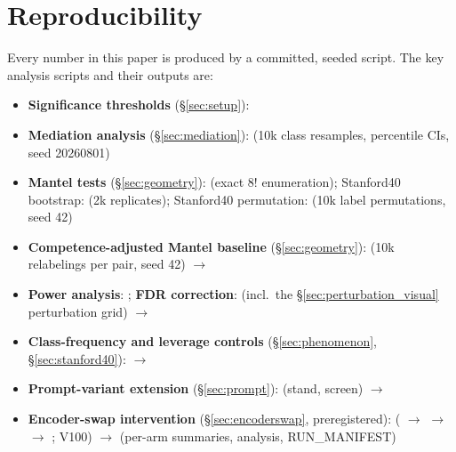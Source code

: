 \documentclass[a4paper,fleqn]{cas-sc}
\begin{document}
\section{Reproducibility}
\label{sec:reproducibility}
\sloppy\raggedright

Every number in this paper is produced by a committed, seeded script. The key analysis scripts and their outputs are:

\begin{itemize}
  \item \textbf{Significance thresholds} (\S\ref{sec:setup}): 
  \item \textbf{Mediation analysis} (\S\ref{sec:mediation}):  (10k class resamples, percentile CIs, seed 20260801)
  \item \textbf{Mantel tests} (\S\ref{sec:geometry}):  (exact $8!$ enumeration); Stanford40 bootstrap:  (2k replicates); Stanford40 permutation:  (10k label permutations, seed 42)
  \item \textbf{Competence-adjusted Mantel baseline} (\S\ref{sec:geometry}):  (10k relabelings per pair, seed 42) \hfill\break $\rightarrow$ 
  \item \textbf{Power analysis}: ; \textbf{FDR correction}:  (incl.\ the \S\ref{sec:perturbation_visual} perturbation grid) \hfill\break $\rightarrow$ 
  \item \textbf{Class-frequency and leverage controls} (\S\ref{sec:phenomenon}, \S\ref{sec:stanford40}):  \hfill\break $\rightarrow$ 
  \item \textbf{Prompt-variant extension} (\S\ref{sec:prompt}):  (stand, screen) \hfill\break $\rightarrow$ 
  \item \textbf{Encoder-swap intervention} (\S\ref{sec:encoderswap}, preregistered):  ( $\rightarrow$  $\rightarrow$  $\rightarrow$ ; V100) \hfill\break $\rightarrow$  (per-arm summaries, analysis, RUN\_MANIFEST)

\end{itemize}
\end{document}
